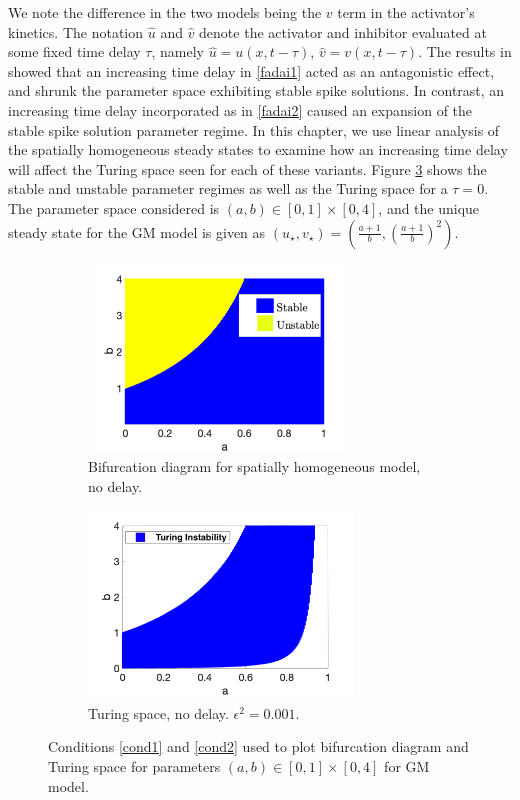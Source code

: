 We note the difference in the two models being the $v$ term in the activator's kinetics. The notation $\hat{u}$ and $\hat{v}$ denote the activator and inhibitor evaluated at some fixed time delay $\tau$, namely $\hat{u}=u(x,t-\tau)$, $\hat{v}=v(x,t-\tau)$. The results in \cite{fadai1,fadai2} showed that an increasing time delay in \eqref{fadai1} acted as an antagonistic effect, and shrunk the parameter space exhibiting stable spike solutions. In contrast, an increasing time delay incorporated as in \eqref{fadai2} caused an expansion of the stable spike solution parameter regime. In this chapter, we use linear analysis of the spatially homogeneous steady states to examine how an increasing time delay will affect the Turing space seen for each of these variants. Figure \ref{fig:gmspace} shows the stable and unstable parameter regimes as well as the Turing space for a $\tau=0$. The parameter space considered is $(a,b)\in[0,1]\times[0,4]$, and the unique steady state for the GM model is given as $(u_\star,v_\star)=\left(\frac{a+1}{b},\left(\frac{a+1}{b}\right)^2\right)$.

\begin{figure}[H]
    \centering
    \begin{subfigure}[t]{0.45\textwidth}
        \centering
        \includegraphics[width=7cm,height = 5cm]{bifgm.png}
        \caption{Bifurcation diagram for spatially homogeneous model, no delay.}
        \label{fig:bifgm}
    \end{subfigure}
    \hfill
    \begin{subfigure}[t]{0.45\textwidth}
        \centering
        \includegraphics[width=7cm,height = 5cm]{turingspacegm.png}
        \caption{Turing space, no delay. $\epsilon^2=0.001$.}
        \label{fig:turingspacegm}
    \end{subfigure}
    \caption{Conditions \eqref{cond1} and \eqref{cond2} used to plot bifurcation diagram and Turing space for parameters $(a,b)\in[0,1]\times[0,4]$ for GM model.}
    \label{fig:gmspace}
\end{figure}


